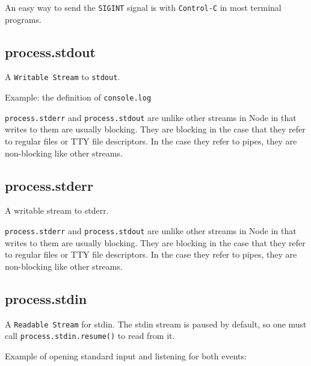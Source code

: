 An easy way to send the \texttt{SIGINT} signal is with
\texttt{Control-C} in most terminal programs.

\subsection{process.stdout}

A \texttt{Writable Stream} to \texttt{stdout}.

Example: the definition of \texttt{console.log}

\begin{Shaded}
\begin{Highlighting}[]
 \NormalTok{= } 
  \NormalTok{);}
\NormalTok{\};}
\end{Highlighting}
\end{Shaded}

\texttt{process.stderr} and \texttt{process.stdout} are unlike other
streams in Node in that writes to them are usually blocking. They are
blocking in the case that they refer to regular files or TTY file
descriptors. In the case they refer to pipes, they are non-blocking like
other streams.

\subsection{process.stderr}

A writable stream to stderr.

\texttt{process.stderr} and \texttt{process.stdout} are unlike other
streams in Node in that writes to them are usually blocking. They are
blocking in the case that they refer to regular files or TTY file
descriptors. In the case they refer to pipes, they are non-blocking like
other streams.

\subsection{process.stdin}

A \texttt{Readable Stream} for stdin. The stdin stream is paused by
default, so one must call \texttt{process.stdin.resume()} to read from
it.

Example of opening standard input and listening for both events:

